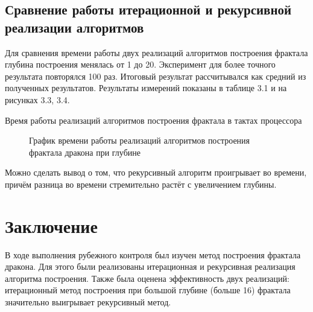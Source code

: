 \documentclass[12pt, a4paper]{report}
\begin{document}
	\section{Сравнение работы итерационной и рекурсивной реализации алгоритмов}
	Для сравнения времени работы двух реализаций алгоритмов построения фрактала глубина построения менялась от 1 до 20. Эксперимент для более точного результата повторялся 100 раз. Итоговый результат рассчитывался как средний из полученных результатов. Результаты измерений показаны в таблице 3.1 и на рисунках 3.3, 3.4.\\
	\begin{table}[ht!]
		\caption{Время работы реализаций алгоритмов построения фрактала в тактах процессора}
		\begin{center}
		\end{center}
	\end{table}
	
	\begin{figure}[ht!]
		\caption{График времени работы реализаций алгоритмов построения фрактала дракона при глубине}
	\end{figure}

	Можно сделать вывод о том, что рекурсивный алгоритм проигрывает во времени, причём разница во времени стремительно растёт с увеличением глубины.

	\chapter*{Заключение}
	В ходе выполнения рубежного контроля был изучен метод построения фрактала дракона. Для этого были реализованы итерационная и рекурсивная реализация алгоритма построения. Также была оценена эффективность двух реализаций: итерационный метод построения при большой глубине (больше 16) фрактала значительно выигрывает рекурсивный метод.
	
\end{document}
